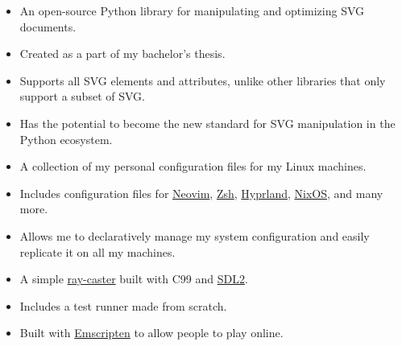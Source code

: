 \documentclass[10pt,a4paper,ragged2e,withhyper]{altacv}
\begin{document}
\begin{paracol}{2}
	\medskip

	\medskip

	\begin{itemize}
		\item An open-source Python library for manipulating and optimizing SVG documents.
		\item Created as a part of my bachelor's thesis.
		\item Supports all SVG elements and attributes, unlike other libraries that only support a subset of SVG.
		\item Has the potential to become the new standard for SVG manipulation in the Python ecosystem.
	\end{itemize}

	\divider

	\begin{itemize}
		\item A collection of my personal configuration files for my Linux machines.
		\item Includes configuration files for \href{https://neovim.io/}{Neovim}, \href{https://www.zsh.org/}{Zsh}, \href{https://hyprland.org/}{Hyprland}, \href{https://nixos.org/}{NixOS}, and many more.
		\item Allows me to declaratively manage my system configuration and easily replicate it on all my machines.
	\end{itemize}

	\divider

	\begin{itemize}
		\item A simple \href{https://en.wikipedia.org/wiki/Ray_casting}{ray-caster} built with C99 and \href{https://www.libsdl.org/}{SDL2}.
		\item Includes a test runner made from scratch.
		\item Built with \href{https://emscripten.org/}{Emscripten} to allow people to play online.
	\end{itemize}
\end{paracol}
\end{document}
